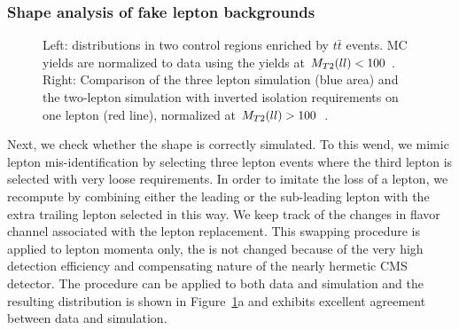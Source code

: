 \subsubsection{ Shape analysis of fake lepton backgrounds }

\begin{figure}[!hbtp]
\centering
{}
\caption{Left: \mtll distributions in two control regions enriched by $t\bar{t}$ events. MC yields are normalized to data using the yields at $M_{T2}(ll)<100$ \GeV. Right: Comparison of the three lepton simulation (blue area) 
and the two-lepton simulation with inverted isolation requirements on one lepton (red line), normalized at $M_{T2}(ll)>100$~\GeV. }
\label{fig:ttBar_3l}
\end{figure}

Next, we check whether the \mtll shape is correctly simulated. To this wend, we mimic lepton mis-identification by selecting three lepton events where the third lepton is selected with very loose requirements. 
In order to imitate the loss of a lepton, we recompute \mtll by combining either the leading or the sub-leading lepton with the extra trailing lepton selected in this way.
We keep track of the changes in flavor channel associated with the lepton replacement.
This swapping procedure is applied to lepton momenta only, the \ETmiss is not changed because of the very high detection efficiency and compensating nature of the nearly hermetic CMS detector.
The procedure can be applied to both data and simulation and the resulting \mtll distribution is shown in Figure~\ref{fig:ttBar_3l}a and exhibits excellent agreement between data and simulation.

